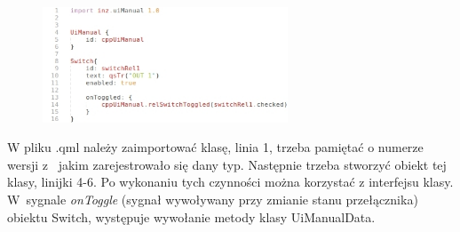 \documentclass[12pt, eng, twoside, openany, final]{mgr}
\begin{document}
                    \begin{figure}[H]
                    \begin{center}
                        \includegraphics[width=0.65\textwidth]{code_qml.jpg}
                    \end{center}
                    \end{figure}
      \noindent              W pliku .qml należy zaimportować klasę, linia 1, trzeba pamiętać o numerze wersji z~ jakim zarejestrowało się dany typ. Następnie trzeba stworzyć obiekt tej klasy, linijki 4-6.
                    Po wykonaniu tych czynności można korzystać z interfejsu klasy. W~sygnale \emph{onToggle} (sygnał wywoływany przy zmianie stanu przełącznika) obiektu Switch, występuje wywołanie metody klasy UiManualData.
                
                \newpage
                
                
\end{document}

